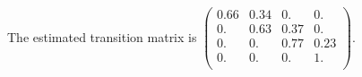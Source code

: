 \documentclass[english]{article}
\numberwithin{equation}{section}
\DeclarePairedDelimiter\paren{(}{)}           %
\DeclarePairedDelimiter\bkt{[}{]}             %
\begin{document}
	The estimated transition matrix is
		$\left(
	\begin{array}{cccc}
	0.66 & 0.34 & 0. & 0. \\
	0. & 0.63 & 0.37 & 0. \\
	0. & 0. & 0.77 & 0.23 \\
	0. & 0. & 0. & 1. \\
	\end{array}
	\right).$
%	
%	
%	
%	
%	
%	
%	
%	
	
	
\end{document}
